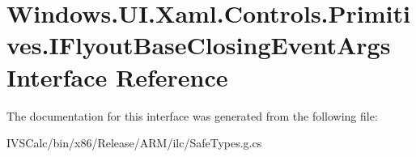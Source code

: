 \hypertarget{interface_windows_1_1_u_i_1_1_xaml_1_1_controls_1_1_primitives_1_1_i_flyout_base_closing_event_args}{}\section{Windows.\+U\+I.\+Xaml.\+Controls.\+Primitives.\+I\+Flyout\+Base\+Closing\+Event\+Args Interface Reference}
\label{interface_windows_1_1_u_i_1_1_xaml_1_1_controls_1_1_primitives_1_1_i_flyout_base_closing_event_args}


The documentation for this interface was generated from the following file\+:\begin{DoxyCompactItemize}
\item 
I\+V\+S\+Calc/bin/x86/\+Release/\+A\+R\+M/ilc/Safe\+Types.\+g.\+cs\end{DoxyCompactItemize}
